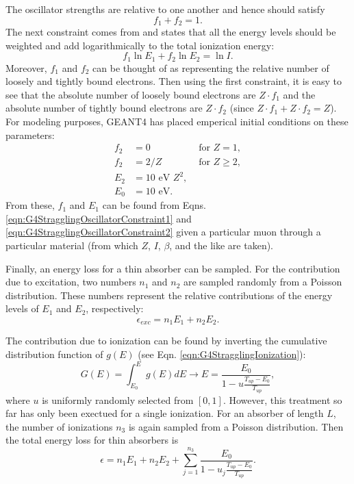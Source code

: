 The oscillator strengths are relative to one another and hence should satisfy
\begin{equation}\label{eqn:G4StragglingOscillatorConstraint1}
f_1+f_2=1.
\end{equation}
The next constraint comes from \cite{bichsel1988} and states that all the energy levels should be weighted and add logarithmically to the total ionization energy:
\begin{equation}\label{eqn:G4StragglingOscillatorConstraint2}
f_1 \ln E_1 + f_2 \ln E_2 = \ln I.
\end{equation}
Moreover, $f_1$ and $f_2$ can be thought of as representing the relative number of loosely and tightly bound electrons. Then using the first constraint, it is easy to see that the absolute number of loosely bound electrons are $Z\cdot f_1$ and the absolute number of tightly bound electrons are $Z\cdot f_2$ (since $Z\cdot f_1+Z\cdot f_2=Z$). For modeling purposes, GEANT4 has placed emperical initial conditions on these parameters:
\begin{align} \label{eqn:G4StragglingOscillatorConstraint3}
f_2 & = 0 & \text{   for   } Z=1,\\
f_2 & = 2/Z & \text{     for     } Z\ge 2,\\
E_2 & = 10 \text{ eV } Z^2,\\
E_0 &= 10 \text{ eV}.
\end{align}
From these, $f_1$ and $E_1$ can be found from Eqns. \ref{eqn:G4StragglingOscillatorConstraint1} and \ref{eqn:G4StragglingOscillatorConstraint2} given a particular muon through a particular material (from which $Z$, $I$, $\beta$, and the like are taken).

Finally, an energy loss for a thin absorber can be sampled. For the contribution due to excitation, two numbers $n_1$ and $n_2$ are sampled randomly from a Poisson distribution. These numbers represent the relative contributions of the energy levels of $E_1$ and $E_2$, respectively:
\begin{equation}\nonumber
\epsilon_{exc}=n_1 E_1 + n_2 E_2.
\end{equation}

The contribution due to ionization can be found by inverting the cumulative distribution function of $g(E)$ (see Eqn. \ref{eqn:G4StragglingIonization}):
\begin{equation}\nonumber
G(E)=\int_{E_0}^E g(E) dE \rightarrow E=\frac{E_0}{1-u\frac{T_{up}-E_0}{T_{up}}},
\end{equation}
where $u$ is uniformly randomly selected from $[0,1]$. However, this treatment so far has only been exectued for a single ionization. For an absorber of length $L$, the number of ionizations $n_3$ is again sampled from a Poisson distribution. Then the total energy loss for thin absorbers is
\begin{equation}\label{G4StragglingThin}
\epsilon = n_1 E_1 + n_2 E_2 + \sum_{j=1}^{n_3} \frac{E_0}{1-u_j \frac{T_{up}-E_0}{T_{up}}}.
\end{equation}

